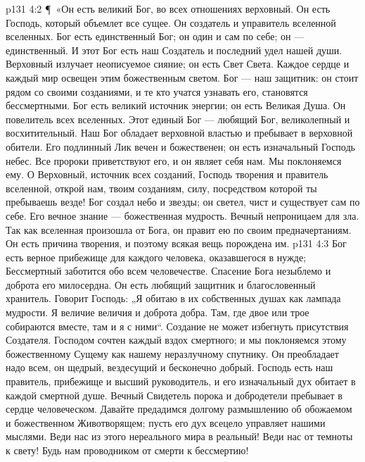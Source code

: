 \vs p131 4:2 \P\ «Он есть великий Бог, во всех отношениях верховный. Он есть Господь, который объемлет все сущее. Он создатель и управитель вселенной вселенных. Бог есть единственный Бог; он один и сам по себе; он --- единственный. И этот Бог есть наш Создатель и последний удел нашей души. Верховный излучает неописуемое сияние; он есть Свет Света. Каждое сердце и каждый мир освещен этим божественным светом. Бог --- наш защитник: он стоит рядом со своими созданиями, и те кто учатся узнавать его, становятся бессмертными. Бог есть великий источник энергии; он есть Великая Душа. Он повелитель всех вселенных. Этот единый Бог --- любящий Бог, великолепный и восхитительный. Наш Бог обладает верховной властью и пребывает в верховной обители. Его подлинный Лик вечен и божественен; он есть изначальный Господь небес. Все пророки приветствуют его, и он являет себя нам. Мы поклоняемся ему. О Верховный, источник всех созданий, Господь творения и правитель вселенной, открой нам, твоим созданиям, силу, посредством которой ты пребываешь везде! Бог создал небо и звезды; он светел, чист и существует сам по себе. Его вечное знание --- божественная мудрость. Вечный непроницаем для зла. Так как вселенная произошла от Бога, он правит ею по своим предначертаниям. Он есть причина творения, и поэтому всякая вещь порождена им.
\vs p131 4:3 Бог есть верное прибежище для каждого человека, оказавшегося в нужде; Бессмертный заботится обо всем человечестве. Спасение Бога незыблемо и доброта его милосердна. Он есть любящий защитник и благословенный хранитель. Говорит Господь: „Я обитаю в их собственных душах как лампада мудрости. Я величие величия и доброта добра. Там, где двое или трое собираются вместе, там и я с ними“. Создание не может избегнуть присутствия Создателя. Господом сочтен каждый вздох смертного; и мы поклоняемся этому божественному Сущему как нашему неразлучному спутнику. Он преобладает надо всем, он щедрый, вездесущий и бесконечно добрый. Господь есть наш правитель, прибежище и высший руководитель, и его изначальный дух обитает в каждой смертной душе. Вечный Свидетель порока и добродетели пребывает в сердце человеческом. Давайте предадимся долгому размышлению об обожаемом и божественном Животворящем; пусть его дух всецело управляет нашими мыслями. Веди нас из этого нереального мира в реальный! Веди нас от темноты к свету! Будь нам проводником от смерти к бессмертию!
